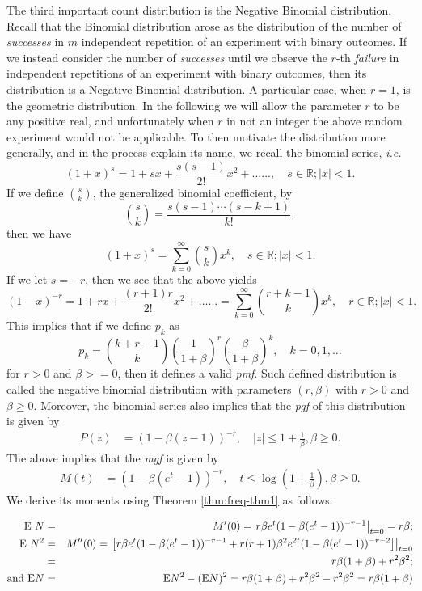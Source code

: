 \documentclass[]{book}
\theoremstyle{definition}
\theoremstyle{definition}
\theoremstyle{definition}
\theoremstyle{remark}
\begin{document}
The third important count distribution is the Negative Binomial
distribution. Recall that the Binomial distribution arose as the
distribution of the number of \emph{successes} in \(m\) independent
repetition of an experiment with binary outcomes. If we instead consider
the number of \emph{successes} until we observe the \(r\)-th
\emph{failure} in independent repetitions of an experiment with binary
outcomes, then its distribution is a Negative Binomial distribution. A
particular case, when \(r=1\), is the geometric distribution. In the
following we will allow the parameter \(r\) to be any positive real, and
unfortunately when \(r\) in not an integer the above random experiment
would not be applicable. To then motivate the distribution more
generally, and in the process explain its name, we recall the binomial
series, \emph{i.e.} \[
(1+x)^s= 1 + s x + \frac{s(s-1)}{2!}x^2 + \ldots..., \quad s\in\mathbb{R}; \vert x \vert<1.
\] If we define \(\binom{s}{k}\), the generalized binomial coefficient,
by \[
\binom{s}{k}=\frac{s(s-1)\cdots(s-k+1)}{k!},
\] then we have \[
(1+x)^s= \sum_{k=0}^{\infty} \binom{s}{k} x^k, \quad s\in\mathbb{R}; \vert x \vert<1.
\] If we let \(s=-r\), then we see that the above yields \[
(1-x)^{-r}= 1 + r x + \frac{(r+1)r}{2!}x^2 + \ldots...= \sum_{k=0}^\infty \binom{r+k-1}{k} x^k, \quad r\in\mathbb{R}; \vert x \vert<1.
\] This implies that if we define \(p_k\) as \[
p_k = \binom{k+r-1}{k} \left(\frac{1}{1+\beta}\right)^r \left(\frac{\beta}{1+\beta}\right)^k, \quad k=0,1,\ldots
\] for \(r>0\) and \(\beta>=0\), then it defines a valid \emph{pmf}.
Such defined distribution is called the negative binomial distribution
with parameters \((r,\beta)\) with \(r>0\) and \(\beta\geq 0\).
Moreover, the binomial series also implies that the \emph{pgf} of this
distribution is given by \[
\begin{aligned}
  P(z) &= (1-\beta(z-1))^{-r}, \quad \vert z \vert \leq 1+\frac{1}{\beta}, \beta\geq0. 
\end{aligned}
\] The above implies that the \emph{mgf} is given by \[
\begin{aligned}
  M(t) &= (1-\beta(e^t-1))^{-r}, \quad t \leq \log\left(1+\frac{1}{\beta}\right), \beta\geq0. 
\end{aligned}
\] We derive its moments using Theorem \ref{thm:freq-thm1} as follows:

\begin{eqnarray*}
\mathrm{E}~{N}&=&M'(0)= \left. r\beta e^t (1-\beta(e^t-1))^{-r-1}\right\vert_{t=0}=r\beta;\\
\mathrm{E}~{N^2}&=&M''(0)= \left.\left[ r\beta e^t (1-\beta(e^t-1))^{-r-1} + r(r+1)\beta^2 e^{2t} (1-\beta(e^t-1))^{-r-2}\right]\right\vert_{t=0}\\
&=&r\beta(1+\beta)+r^2\beta^2;\\
\hbox{and }\mathrm{E}{N}&=&\mathrm{E}{N^2}-(\mathrm{E}{N})^2=r\beta(1+\beta)+r^2\beta^2-r^2\beta^2=r\beta(1+\beta)
\end{eqnarray*}
\end{document}
